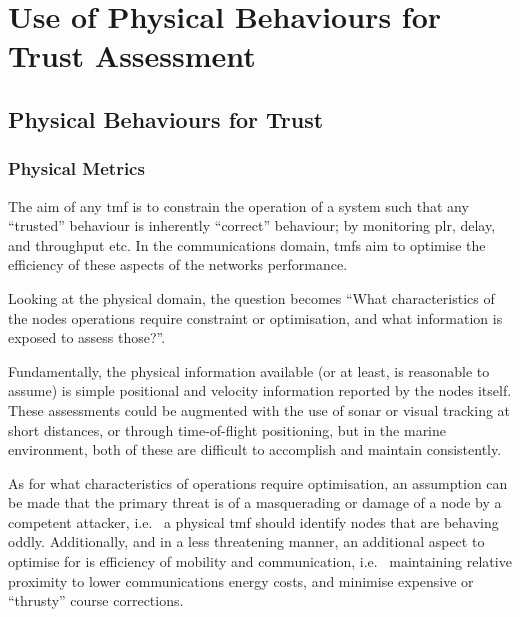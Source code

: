 \chapter{Use of Physical Behaviours for Trust Assessment} \label{ch:physical_trust}

\section{Physical Behaviours for Trust}\label{sec:physbev}

\subsection{Physical Metrics}
The aim of any \gls{tmf} is to constrain the operation of a system such that any ``trusted'' behaviour is inherently ``correct'' behaviour; by monitoring \gls{plr}, delay, and throughput etc. 
In the communications domain, \glspl{tmf} aim to optimise the efficiency of these aspects of the networks performance.

Looking at the physical domain, the question becomes ``What characteristics of the nodes operations require constraint or optimisation, and what information is exposed to assess those?''.

Fundamentally, the physical information available (or at least, is reasonable to assume) is simple positional and velocity information reported by the nodes itself.
These assessments could be augmented with the use of sonar or visual tracking at short distances, or through time-of-flight positioning, but in the marine environment, both of these are difficult to accomplish and maintain consistently.

As for what characteristics of operations require optimisation, an assumption can be made that the primary threat is of a masquerading or damage of a node by a competent attacker, i.e.~ a physical \gls{tmf} should identify nodes that are behaving oddly. 
Additionally, and in a less threatening manner, an additional aspect to optimise for is efficiency of mobility and communication, i.e.~ maintaining relative proximity to lower communications energy costs, and minimise expensive or ``thrusty'' course corrections.


